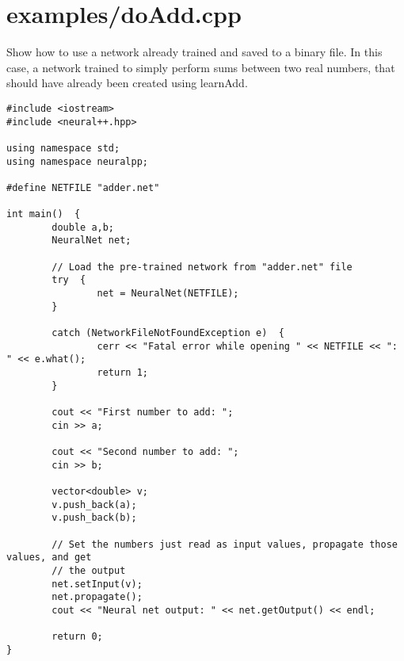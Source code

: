 \section{examples/doAdd.cpp}
Show how to use a network already trained and saved to a binary file. In this case, a network trained to simply perform sums between two real numbers, that should have already been created using learnAdd.



\begin{DocInclude}\begin{verbatim}
#include <iostream>
#include <neural++.hpp>

using namespace std;
using namespace neuralpp;

#define NETFILE "adder.net"

int main()  {
        double a,b;
        NeuralNet net;

        // Load the pre-trained network from "adder.net" file
        try  {
                net = NeuralNet(NETFILE);
        }

        catch (NetworkFileNotFoundException e)  {
                cerr << "Fatal error while opening " << NETFILE << ": " << e.what();
                return 1;
        }

        cout << "First number to add: ";
        cin >> a;

        cout << "Second number to add: ";
        cin >> b;

        vector<double> v;
        v.push_back(a);
        v.push_back(b);

        // Set the numbers just read as input values, propagate those values, and get
        // the output
        net.setInput(v);
        net.propagate();
        cout << "Neural net output: " << net.getOutput() << endl;

        return 0;
}

\end{verbatim}
\end{DocInclude}
 